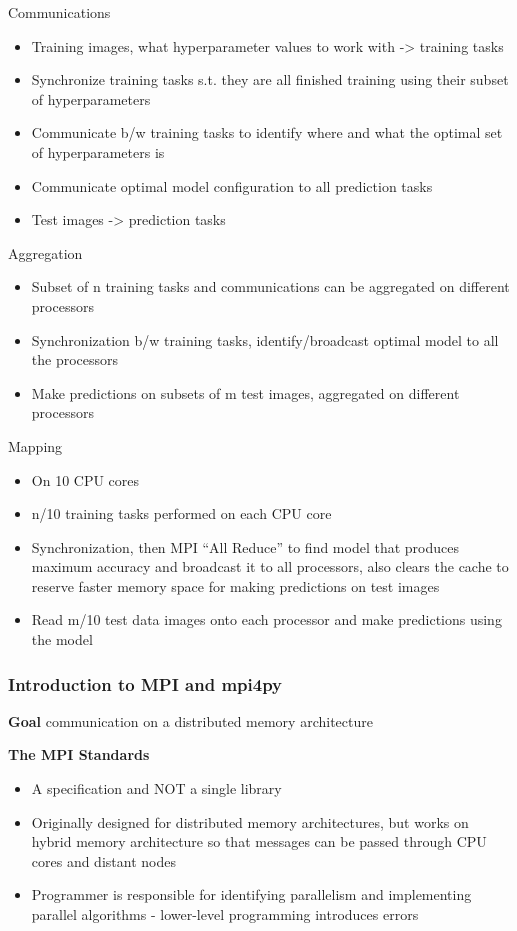 \documentclass{article}
\begin{document}
Communications
\begin{itemize}
    \item Training images, what hyperparameter values to work with -> training tasks
    \item Synchronize training tasks s.t. they are all finished training using their subset of hyperparameters
    \item Communicate b/w training tasks to identify where and what the optimal set of hyperparameters is
    \item Communicate optimal model configuration to all prediction tasks
    \item Test images -> prediction tasks
\end{itemize}

Aggregation
\begin{itemize}
    \item Subset of n training tasks and communications can be aggregated on different processors
    \item Synchronization b/w training tasks, identify/broadcast optimal model to all the processors
    \item Make predictions on subsets of m test images, aggregated on different processors
\end{itemize}

Mapping
\begin{itemize}
    \item On 10 CPU cores
    \item n/10 training tasks performed on each CPU core
    \item Synchronization, then MPI “All Reduce” to find model that produces maximum accuracy and broadcast it to all processors, also clears the cache to reserve faster memory space for making predictions on test images
    \item Read m/10 test data images onto each processor and make predictions using the model 
\end{itemize}

\subsubsection{Introduction to MPI and mpi4py}

\textbf{Goal} communication on a distributed memory architecture

\textbf{The MPI Standards}
\begin{itemize}
    \item A specification and NOT a single library
    \item Originally designed for distributed memory architectures, but works on hybrid memory architecture so that messages can be passed through CPU cores and distant nodes
    \item Programmer is responsible for identifying parallelism and implementing parallel algorithms - lower-level programming introduces errors
\end{itemize}
\end{document}
